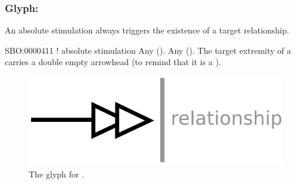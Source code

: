 
\subsubsection{Glyph: }\label{sec:absoluteStimulation}

An absolute stimulation always triggers the existence of a target relationship. 

\begin{glyphDescription}
 \glyphSboTerm SBO:0000411 ! absolute stimulation
 \glyphOrigin Any  ().
 \glyphTarget Any  ().
 \glyphEndPoint The target extremity of a  carries a double empty arrowhead (to remind that it is a ).
 \end{glyphDescription}

\begin{figure}[H]
  \centering
  \includegraphics[scale = 0.5]{images/absoluteStimulation}
  \caption{The \ER glyph for .}
  \label{fig:absoluteStimulation}
\end{figure}

